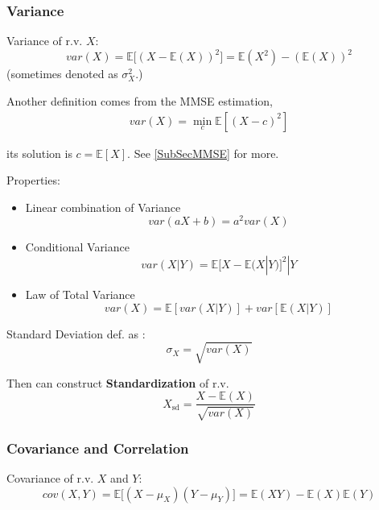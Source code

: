 \subsubsection{Variance}
    Variance of r.v. $X$: 
    \begin{equation}
        var(X)=\mathbb{E}\big[(X-\mathbb{E}(X))^2\big]=\mathbb{E}(X^2)-(\mathbb{E}(X))^2
    \end{equation}
    (sometimes denoted as $\sigma^2_X$.)

    Another definition comes from the MMSE estimation, 
    \begin{align}
        var(X)=\mathop{\min}\limits_{c}\mathbb{E}\left[ (X-c)^2 \right]   
    \end{align}
    
    its solution is $ c=\mathbb{E}\left[ X \right]  $. See \autoref{SubSecMMSE} for more.

\begin{point}
    Properties:
\end{point}

\begin{itemize} 
    \item Linear combination of Variance\begin{equation}
        var(aX+b)=a^2var(X)
    \end{equation}
    \item Conditional Variance
    \begin{equation}
        var(X|Y)=\mathbb{E}{[X-\mathbb{E}(X|Y)]^2|Y}
    \end{equation}
    \item Law of Total Variance\begin{equation}
        var(X)=\mathbb{E}[var(X|Y)]+var[\mathbb{E}(X|Y)]
    \end{equation}
\end{itemize}

    Standard Deviation def. as :
    \begin{equation}\sigma_X=\sqrt{var(X)}\end{equation}

    Then can construct \textbf{Standardization} of r.v.
    \begin{equation}X_\mathrm{sd} =\frac{X-\mathbb{E}(X)}{\sqrt{var(X)}}\end{equation}


\subsubsection{Covariance and Correlation}\label{SubSubSectionCovarianceAndCorrelation}
    Covariance of r.v. $X$ and $Y$:\begin{equation}
        cov(X,Y)=\mathbb{E}\big[(X-\mu_X)(Y-\mu_Y)\big]=\mathbb{E}(XY)-\mathbb{E}(X)\mathbb{E}(Y)
    \end{equation}

